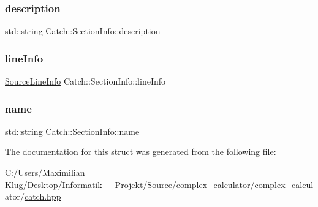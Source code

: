 \subsubsection{\texorpdfstring{description}{description}}
{\footnotesize\ttfamily std\+::string Catch\+::\+Section\+Info\+::description}

\mbox{\label{struct_catch_1_1_section_info_adbc83b8a3507c4acc8ee249e93465711}} 
\subsubsection{\texorpdfstring{line\+Info}{lineInfo}}
{\footnotesize\ttfamily \mbox{\hyperlink{struct_catch_1_1_source_line_info}{Source\+Line\+Info}} Catch\+::\+Section\+Info\+::line\+Info}

\mbox{\label{struct_catch_1_1_section_info_a704c8fc662d309137e0d4f199cb7df58}} 
\subsubsection{\texorpdfstring{name}{name}}
{\footnotesize\ttfamily std\+::string Catch\+::\+Section\+Info\+::name}



The documentation for this struct was generated from the following file\+:\begin{DoxyCompactItemize}
\item 
C\+:/\+Users/\+Maximilian Klug/\+Desktop/\+Informatik\+\_\+\_\+\+Projekt/\+Source/complex\+\_\+calculator/complex\+\_\+calculator/\mbox{\hyperlink{catch_8hpp}{catch.\+hpp}}\end{DoxyCompactItemize}
